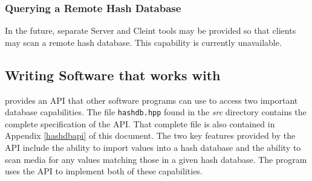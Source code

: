 \documentclass[11pt,fleqn]{article} %
\begin{document}
\subsubsection{Querying a Remote Hash Database}
In the future, separate \hdb Server and Cleint tools may be provided so that clients may scan a remote hash database.  This capability is currently unavailable.


%
%
%
%
%

\subsection{Writing Software that works with \hash}
\label{APISection}
\hash provides an API that other software programs can use to access two important database capabilities. The file \texttt{hashdb.hpp} found in the \textit{src} directory contains the complete specification of the API. That complete file is also contained in Appendix \ref{hashdbapi} of this document.  The two key features provided by the API include the ability to import values into a hash database and the ability to scan media for any values matching those in a given hash database.  The \bulk program uses the \hash API to implement both of these capabilities.\\
\end{document}
